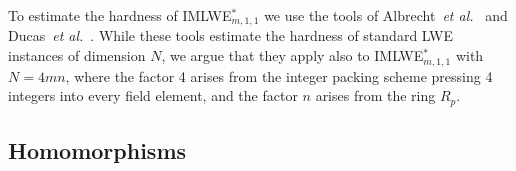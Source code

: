 To estimate the hardness of IMLWE$^*_{m, 1, 1}$ we use the tools of Albrecht~\emph{et al.}~\cite{} and Ducas~\emph{et al.}~\cite{}. While these tools estimate the hardness of standard LWE instances of dimension $N$, we argue that they apply also to IMLWE$^*_{m,1,1}$ with $N = 4 m n$, where the factor 4 arises from the integer packing scheme pressing 4 integers into every field element, and the factor $n$ arises from the ring $R_p$.

\subsection{Homomorphisms}


